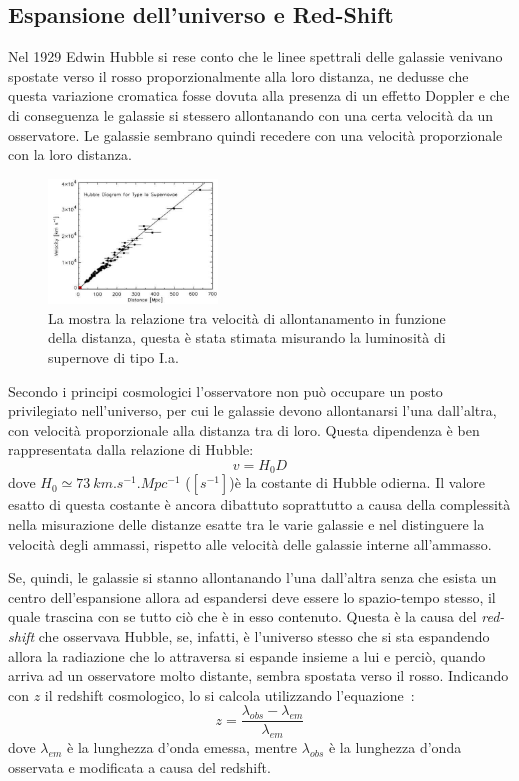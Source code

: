 \subsection{Espansione dell'universo e Red-Shift}\label{sec:espansione}

Nel 1929 Edwin Hubble si rese conto che le linee spettrali delle galassie venivano spostate verso il rosso proporzionalmente alla loro distanza, ne dedusse che questa variazione cromatica fosse dovuta alla  presenza di un effetto Doppler e che di conseguenza le galassie si stessero allontanando con una certa velocità da un osservatore. Le galassie sembrano quindi recedere con una velocità proporzionale con la loro distanza.

\begin{figure}
    \centering
    \includegraphics[width=0.4\textwidth]{immagini/redshift.jpg}
    \caption{La mostra la relazione tra velocità di allontanamento in funzione della distanza, questa è stata stimata misurando la luminosità di supernove di tipo I.a.}\label{fig:redshift}
\end{figure}

Secondo i principi cosmologici l'osservatore non può occupare un posto privilegiato nell'universo, per cui le galassie devono allontanarsi l'una dall'altra, con velocità proporzionale alla distanza tra di loro. Questa dipendenza è ben rappresentata dalla relazione di Hubble:
\begin{equation}\label{eq:hubble}
    v = H_0 D
\end{equation}
dove $H_0 \simeq \SI{73}{km.s^{-1}.Mpc^{-1}}$ ($[s^{-1}]$)è la costante di Hubble odierna. Il valore esatto di questa costante è ancora dibattuto soprattutto a causa della complessità nella misurazione delle distanze esatte tra le varie galassie e nel distinguere la velocità degli ammassi, rispetto alle velocità delle galassie interne all'ammasso.

Se, quindi, le galassie si stanno allontanando l'una dall'altra senza che esista un centro dell'espansione allora ad espandersi deve essere lo spazio-tempo stesso, il quale trascina con se tutto ciò che è in esso contenuto. Questa è la causa del \textit{red-shift} che osservava Hubble, se, infatti, è l'universo stesso che si sta espandendo allora la radiazione che lo attraversa si espande insieme a lui e perciò, quando arriva ad un osservatore molto distante, sembra spostata verso il rosso. Indicando con $z$ il redshift cosmologico, lo si calcola utilizzando l'equazione~:
\begin{equation}\label{eq:redshift}
    z = \frac{\lambda_{obs} - \lambda_{em}}{\lambda_{em}}
\end{equation}
dove $\lambda_{em}$ è la lunghezza d'onda emessa, mentre $\lambda_{obs}$ è la lunghezza d'onda osservata e modificata a causa del redshift.

